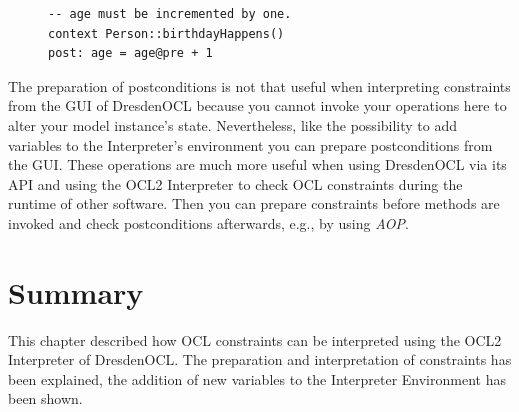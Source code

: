 \begin{figure}[!t]
  \lstset{
    language=OCL
  }
  \begin{lstlisting}[caption={An example Postcondition that must be prepared.}, captionpos=b, label=lst:interpret:postcondition]
-- age must be incremented by one.
context Person::birthdayHappens()
post: age = age@pre + 1
  \end{lstlisting}
\end{figure}

The preparation of postconditions is not that useful when interpreting constraints from the GUI of DresdenOCL because you cannot invoke your operations here to alter your model instance's state. Nevertheless, like the possibility to add variables to the Interpreter's environment you can prepare postconditions from the GUI. These operations are much more useful when using DresdenOCL via its API and using the \acs{OCL}2 Interpreter to check \acs{OCL} constraints during the runtime of other software. Then you can prepare constraints before methods are invoked and check postconditions afterwards, e.g., by using \emph{\acf{AOP}}.



\section{Summary}
  
This chapter described how \acs{OCL} constraints can be interpreted using the \acs{OCL}2 Interpreter of DresdenOCL. The preparation and interpretation of constraints has been explained, the addition of new variables to the Interpreter Environment has been shown.